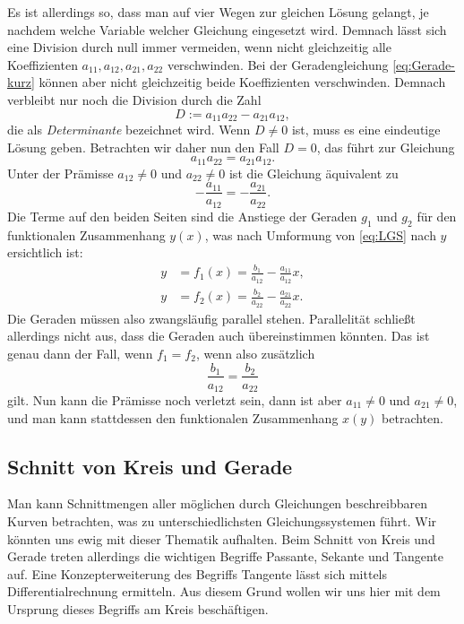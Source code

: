 Es ist allerdings so, dass man auf vier Wegen zur gleichen Lösung
gelangt, je nachdem welche Variable welcher Gleichung eingesetzt
wird. Demnach lässt sich eine Division durch null immer vermeiden,
wenn nicht gleichzeitig alle Koeffizienten
$a_{11}, a_{12}, a_{21}, a_{22}$
verschwinden. Bei der Geradengleichung \eqref{eq:Gerade-kurz}
können aber nicht gleichzeitig beide Koeffizienten verschwinden.
Demnach verbleibt nur noch die Division durch die Zahl%
\[D := a_{11}a_{22}-a_{21}a_{12},\]
die als \emph{Determinante} bezeichnet wird. Wenn $D\ne 0$ ist,
muss es eine eindeutige Lösung geben. Betrachten wir daher
nun den Fall $D=0$, das führt zur Gleichung%
\[a_{11}a_{22} = a_{21}a_{12}.\]
Unter der Prämisse $a_{12}\ne 0$ und $a_{22}\ne 0$ ist die Gleichung
äquivalent zu%
\[-\frac{a_{11}}{a_{12}} = -\frac{a_{21}}{a_{22}}.\]
Die Terme auf den beiden Seiten sind die Anstiege der Geraden
$g_1$ und $g_2$ für den funktionalen Zusammenhang $y(x)$, was
nach Umformung von \eqref{eq:LGS} nach $y$ ersichtlich ist:%
\begin{align*}
y &= f_1(x) = \frac{b_1}{a_{12}} - \frac{a_{11}}{a_{12}}x,\\
y &= f_2(x) = \frac{b_2}{a_{22}} - \frac{a_{21}}{a_{22}}x.
\end{align*}
Die Geraden müssen also zwangsläufig parallel stehen. Parallelität
schließt allerdings nicht aus, dass die Geraden auch übereinstimmen
könnten. Das ist genau dann der Fall, wenn $f_1=f_2$, wenn also
zusätzlich%
\[\frac{b_1}{a_{12}} = \frac{b_2}{a_{22}}\]
gilt. Nun kann die Prämisse noch verletzt sein, dann ist aber
$a_{11}\ne 0$ und $a_{21}\ne 0$, und man kann stattdessen den
funktionalen Zusammenhang $x(y)$ betrachten.

\subsection{Schnitt von Kreis und Gerade}

Man kann Schnittmengen aller möglichen durch Gleichungen
beschreibbaren Kurven betrachten, was zu unterschiedlichsten
Gleichungssystemen führt. Wir könnten uns ewig mit dieser
Thematik aufhalten. Beim Schnitt von Kreis und Gerade treten
allerdings die wichtigen Begriffe Passante, Sekante und Tangente
auf. Eine Konzepterweiterung des Begriffs Tangente lässt sich
mittels Differentialrechnung ermitteln. Aus diesem Grund wollen wir
uns hier mit dem Ursprung dieses Begriffs am Kreis beschäftigen.

